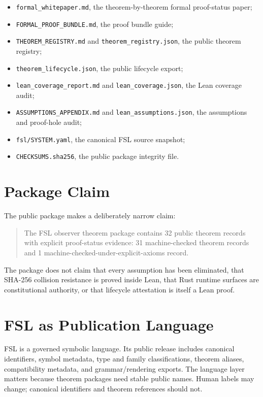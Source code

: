 \documentclass[11pt]{article}
\begin{document}
\begin{itemize}[leftmargin=*]
  \item \texttt{formal\_whitepaper.md}, the theorem-by-theorem formal proof-status paper;
  \item \texttt{FORMAL\_PROOF\_BUNDLE.md}, the proof bundle guide;
  \item \texttt{THEOREM\_REGISTRY.md} and \texttt{theorem\_registry.json}, the public theorem registry;
  \item \texttt{theorem\_lifecycle.json}, the public lifecycle export;
  \item \texttt{lean\_coverage\_report.md} and \texttt{lean\_coverage.json}, the Lean coverage audit;
  \item \texttt{ASSUMPTIONS\_APPENDIX.md} and \texttt{lean\_assumptions.json}, the assumptions and proof-hole audit;
  \item \texttt{fsl/SYSTEM.yaml}, the canonical FSL source snapshot;
  \item \texttt{CHECKSUMS.sha256}, the public package integrity file.
\end{itemize}

\section{Package Claim}

The public package makes a deliberately narrow claim:

\begin{quote}
The FSL observer theorem package contains 32 public theorem records with explicit proof-status evidence: 31 machine-checked theorem records and 1 machine-checked-under-explicit-axioms record.
\end{quote}

The package does not claim that every assumption has been eliminated, that SHA-256 collision resistance is proved inside Lean, that Rust runtime surfaces are constitutional authority, or that lifecycle attestation is itself a Lean proof.

\section{FSL as Publication Language}

FSL is a governed symbolic language. Its public release includes canonical identifiers, symbol metadata, type and family classifications, theorem aliases, compatibility metadata, and grammar/rendering exports. The language layer matters because theorem packages need stable public names. Human labels may change; canonical identifiers and theorem references should not.
\end{document}
